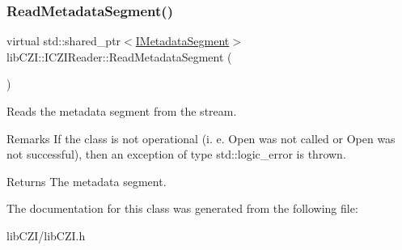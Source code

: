 \subsubsection{\texorpdfstring{Read\+Metadata\+Segment()}{ReadMetadataSegment()}}
{\footnotesize\ttfamily virtual std\+::shared\+\_\+ptr$<$\hyperlink{classlib_c_z_i_1_1_i_metadata_segment}{I\+Metadata\+Segment}$>$ lib\+C\+Z\+I\+::\+I\+C\+Z\+I\+Reader\+::\+Read\+Metadata\+Segment (\begin{DoxyParamCaption}{ }\end{DoxyParamCaption})\hspace{0.3cm}{\ttfamily [pure virtual]}}

Reads the metadata segment from the stream. \begin{DoxyRemark}{Remarks}
If the class is not operational (i. e. Open was not called or Open was not successful), then an exception of type std\+::logic\+\_\+error is thrown.
\end{DoxyRemark}
\begin{DoxyReturn}{Returns}
The metadata segment. 
\end{DoxyReturn}


The documentation for this class was generated from the following file\+:\begin{DoxyCompactItemize}
\item 
lib\+C\+Z\+I/lib\+C\+Z\+I.\+h\end{DoxyCompactItemize}

